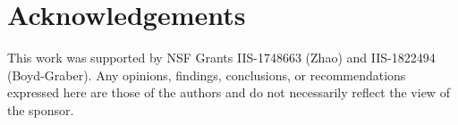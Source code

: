 \documentclass[sigconf]{acmart}
\begin{document}
\section*{Acknowledgements}

This work was supported by NSF Grants IIS-1748663 (Zhao) and
IIS-1822494 (Boyd-Graber).  Any opinions, findings, conclusions, or
recommendations expressed here are those of the authors and do not
necessarily reflect the view of the sponsor.




\normalsize
\newpage


\end{document}
